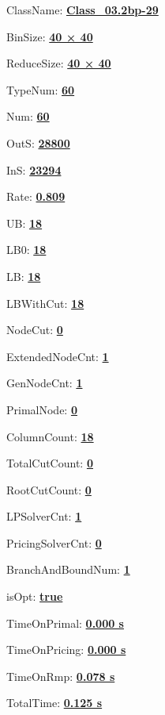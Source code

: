 \documentclass[11pt]{article}
\begin{document}
\pagestyle{empty}


ClassName: \underline{\textbf{Class_03.2bp-29}}
\par
BinSize: \underline{\textbf{40 × 40}}
\par
ReduceSize: \underline{\textbf{40 × 40}}
\par
TypeNum: \underline{\textbf{60}}
\par
Num: \underline{\textbf{60}}
\par
OutS: \underline{\textbf{28800}}
\par
InS: \underline{\textbf{23294}}
\par
Rate: \underline{\textbf{0.809}}
\par
UB: \underline{\textbf{18}}
\par
LB0: \underline{\textbf{18}}
\par
LB: \underline{\textbf{18}}
\par
LBWithCut: \underline{\textbf{18}}
\par
NodeCut: \underline{\textbf{0}}
\par
ExtendedNodeCnt: \underline{\textbf{1}}
\par
GenNodeCnt: \underline{\textbf{1}}
\par
PrimalNode: \underline{\textbf{0}}
\par
ColumnCount: \underline{\textbf{18}}
\par
TotalCutCount: \underline{\textbf{0}}
\par
RootCutCount: \underline{\textbf{0}}
\par
LPSolverCnt: \underline{\textbf{1}}
\par
PricingSolverCnt: \underline{\textbf{0}}
\par
BranchAndBoundNum: \underline{\textbf{1}}
\par
isOpt: \underline{\textbf{true}}
\par
TimeOnPrimal: \underline{\textbf{0.000 s}}
\par
TimeOnPricing: \underline{\textbf{0.000 s}}
\par
TimeOnRmp: \underline{\textbf{0.078 s}}
\par
TotalTime: \underline{\textbf{0.125 s}}
\par
\newpage


\end{document}
